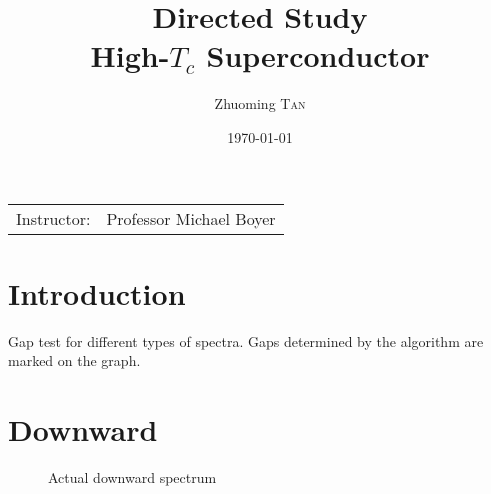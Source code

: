 


\usepackage{pgfplots}
\pgfplotsset{compat=1.11}


\title{Directed Study \\ High-$T_c$ Superconductor} %

\author{Zhuoming \textsc{Tan}} %

\date{\today} %



	\maketitle %

	\begin{center}
		\begin{tabular}{l r}
			Instructor: & Professor Michael Boyer %
		\end{tabular}
	\end{center}


	\section{Introduction}\label{sec:introduction}
	Gap test for different types of spectra. Gaps determined by the algorithm are marked on the graph.

	\section{Downward}\label{sec:d}
	\begin{figure}[H]
		\centering
		\caption{Actual downward spectrum}
	\end{figure}


